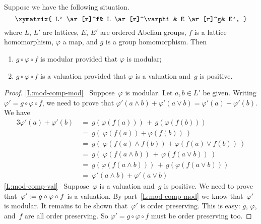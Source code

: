 \documentclass[main.tex]{subfiles}
\begin{document}
\begin{lem}
\label{L:mod-comp}
Suppose we have the following situation.
\begin{equation*}
\xymatrix{
L' \ar[r]^f&
L \ar[r]^\varphi&
E \ar[r]^g&
E',
}
\end{equation*}
where $L$, $L'$ are lattices,
$E$, $E'$ are ordered Abelian groups,
$f$ is a lattice homomorphism,
$\varphi$ a map,
and $g$ is a group homomorphism.
Then
\begin{enumerate}
\item
\label{L:mod-comp-mod}
$g\circ \varphi \circ f$ is modular
provided that $\varphi$ is modular;
\item
\label{L:mod-comp-val}
$g\circ \varphi \circ f$ is a valuation
provided that $\varphi$ is a valuation
and~$g$ is positive.
\end{enumerate}
\end{lem}
\begin{proof}
\noindent
\ref{L:mod-comp-mod}
\  Suppose~$\varphi$ is modular.
Let $a,b\in L'$ be given.
Writing $\varphi'= g\circ\varphi \circ f$,
we need to prove that
$\varphi'(a\wedge b)+\varphi'(a\vee b)=\varphi'(a)+\varphi'(b)$.
We have
\begin{alignat*}{3}
\varphi'(a) + \varphi'(b)
\ &=\ g(\varphi(f(a))) \,+\, g(\varphi(f(b))) \\
  &=\ g(\ \varphi( f(a)) + \varphi( f(b))\ ) \\
  &=\ g(\ \varphi(f(a)\wedge f(b)) + \varphi(f(a)\vee f(b))\ ) \\
  &=\ g(\  \varphi(f(a\wedge b)) \,+\, \varphi(f(a\vee b))\ ) \\
  &=\ g(\varphi(f(a\wedge b))) \,+\, g(\varphi(f(a\vee b))) \\ 
  &=\ \varphi'(a\wedge b) + \varphi'(a \vee b)
\end{alignat*}
\ref{L:mod-comp-val}
\  Suppose~$\varphi$ is a valuation
and~$g$ is positive.
We need to prove that~$\varphi':= g\circ \varphi\circ f$
is a valuation.
By part~\ref{L:mod-comp-mod}
we know that~$\varphi'$ is modular.
It remains to be shown that~$\varphi'$ is order preserving.
This is easy: $g$, $\varphi$, and~$f$ are all order preserving.
So $\varphi'=g\circ\varphi\circ f$ must be order preserving too.
\end{proof}
\end{document}
